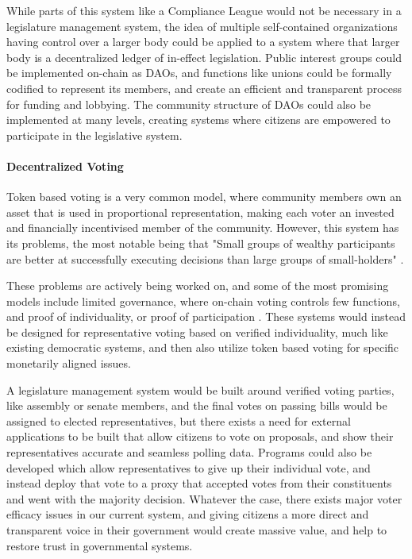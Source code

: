 \documentclass[letterpaper,twocolumn]{article}
\begin{document}
While parts of this system like a Compliance League would not be necessary in a legislature management system, the idea of multiple self-contained organizations having control over a larger body could be applied to a system where that larger body is a decentralized ledger of in-effect legislation.  Public interest groups could be implemented on-chain as DAOs, and functions like unions could be formally codified to represent its members, and create an efficient and transparent process for funding and lobbying.  The community structure of DAOs could also be implemented at many levels, creating systems where citizens are empowered to participate in the legislative system.


\paragraph{Decentralized Voting}
Token based voting is a very common model, where community members own an asset that is used in proportional representation, making each voter an invested and financially incentivised member of the community.  However, this system has its problems, the most notable being that "Small groups of wealthy participants are better at successfully executing decisions than large groups of small-holders" \cite{Vitalik_Voting}.

These problems are actively being worked on, and some of the most promising models include limited governance, where on-chain voting controls few functions, and proof of individuality, or proof of participation \cite{Vitalik_Voting}. These systems would instead be designed for representative voting based on verified individuality, much like existing democratic systems, and then also utilize token based voting for specific monetarily aligned issues.  

A legislature management system would be built around verified voting parties, like assembly or senate members, and the final votes on passing bills would be assigned to elected representatives, but there exists a need for external applications to be built that allow citizens to vote on proposals, and show their representatives accurate and seamless polling data.  Programs could also be developed which allow representatives to give up their individual vote, and instead deploy that vote to a proxy that accepted votes from their constituents and went with the majority decision.  Whatever the case, there exists major voter efficacy issues in our current system, and giving citizens a more direct and transparent voice in their government would create massive value, and help to restore trust in governmental systems.
\end{document}
